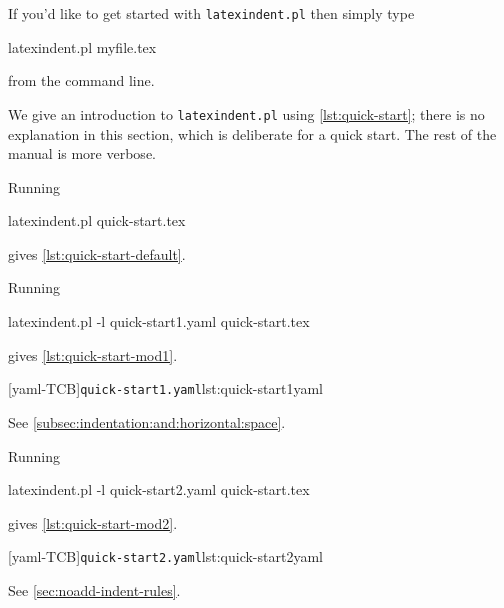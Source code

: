  If you'd like to get started with \texttt{latexindent.pl} then simply type

 \begin{commandshell}
latexindent.pl myfile.tex
\end{commandshell}

 from the command line.

 We give an introduction to \texttt{latexindent.pl} using \cref{lst:quick-start}; there
 is no explanation in this section, which is deliberate for a quick start. The rest of
 the manual is more verbose.


 Running

 \begin{commandshell}
latexindent.pl quick-start.tex
\end{commandshell}

 gives \cref{lst:quick-start-default}.


 \begin{example}
 Running

 \begin{commandshell}
latexindent.pl -l quick-start1.yaml quick-start.tex
\end{commandshell}

 gives \cref{lst:quick-start-mod1}.

 \begin{cmhtcbraster}
  [yaml-TCB]{\texttt{quick-start1.yaml}}{lst:quick-start1yaml}
 \end{cmhtcbraster}
 See \cref{subsec:indentation:and:horizontal:space}.
 \end{example}

 \begin{example}
 Running

 \begin{commandshell}
latexindent.pl -l quick-start2.yaml quick-start.tex
\end{commandshell}

 gives \cref{lst:quick-start-mod2}.

 \begin{cmhtcbraster}
  [yaml-TCB]{\texttt{quick-start2.yaml}}{lst:quick-start2yaml}
 \end{cmhtcbraster}
 See \cref{sec:noadd-indent-rules}.
 \end{example}

